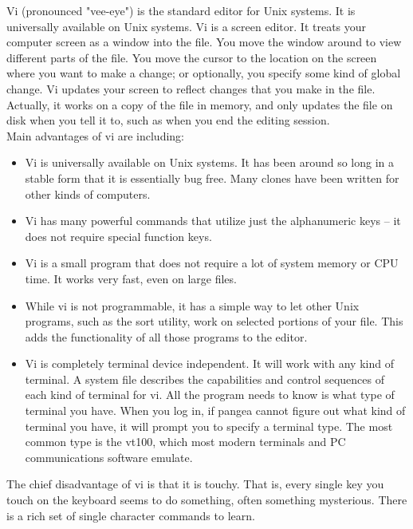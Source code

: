 \begin{information}
Vi (pronounced "vee-eye") is the standard editor for Unix systems. It is universally available on
Unix systems. Vi is a screen editor. It treats your computer screen as a window into the file. You
move the window around to view different parts of the file. You move the cursor to the location on
the screen where you want to make a change; or optionally, you specify some kind of global change.
Vi updates your screen to reflect changes that you make in the file. Actually, it works on a copy of
the file in memory, and only updates the file on disk when you tell it to, such as when you end the
editing session. \\

Main advantages of vi are including: 
\begin{itemize}
  \item Vi is universally available on Unix systems. It has been around so long in a stable form
that it is essentially bug free. Many clones have been written for other kinds of computers.
  \item Vi has many powerful commands that utilize just the alphanumeric keys -- it does not require
special function keys.
  \item Vi is a small program that does not require a lot of system memory or CPU time. It works
very fast, even on large files.
  \item While vi is not programmable, it has a simple way to let other Unix programs, such as the
sort utility, work on selected portions of your file. This adds the functionality of all those
programs to the editor.
  \item Vi is completely terminal device independent. It will work with any kind of terminal.
A system file describes the capabilities and control sequences of each kind of terminal for vi. All
the program needs to know is what type of terminal you have. When you log in, if pangea cannot
figure out what kind of terminal you have, it will prompt you to specify a terminal type. The most
common type is the vt100, which most modern terminals and PC communications software emulate.
\end{itemize}

The chief disadvantage of vi is that it is touchy. That is, every single key you touch on the
keyboard seems to do something, often something mysterious. There is a rich set of single character
commands to learn.
\end{information} 

